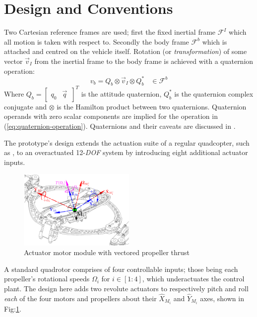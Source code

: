 \documentclass[a4paper, 10pt, conference]{ieeeconf}
\begin{document}
\section{Design and Conventions} 
\label{sec:design}
Two Cartesian reference frames are used; first the fixed inertial frame $\mathcal{F}^{I}$ which all motion is taken with respect to. Secondly the body frame $\mathcal{F}^{b}$ which is attached and centred on the vehicle itself. Rotation (or \emph{transformation}) of some vector $\vec{v}_I$ from the inertial frame to the body frame is achieved with a quaternion operation:
\begin{equation}\label{eq:quaternion-operation}
v_b=Q_b\otimes \vec{v}_I \otimes Q_b^*~~~~\in\mathcal{F}^{b}
\end{equation}
Where $Q_b=\begin{bmatrix}q_0 & \vec{q}\hspace{2pt}\end{bmatrix}^T$ is the attitude quaternion, $Q_b^*$ is the quaternion complex conjugate and $\otimes$ is the Hamilton product between two quaternions. Quaternion operands with zero scalar components are implied for the operation in (\ref{eq:quaternion-operation}). Quaternions and their caveats are discussed in \cite{shoemaker}. \par
The prototype's design extends the actuation suite of a regular quadcopter, such as \cite{x4flyer}, to an overactuated 12-\emph{DOF} system by introducing eight additional actuator inputs.
\newpage
\begin{figure}[tbp]
\centering
\includegraphics[width=0.5\textwidth]{figs/force-redirect}
\vspace{-14pt}
\caption{Actuator motor module with vectored propeller thrust}
\label{fig:force-redirect}
\vspace{-18pt}
\end{figure}
A standard quadrotor comprises of four controllable inputs; those being each propeller's rotational speeds $\Omega_{i}$ for $i\in[1:4]$, which underactuates the control plant. The design here adds two revolute actuators to respectively pitch and roll \emph{each} of the four motors and propellers about their $\hat{X}_{M_i}$ and $\hat{Y}_{M_i}$ axes, shown in Fig:\ref{fig:force-redirect}. 
\end{document}
